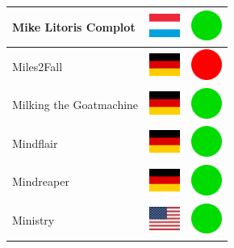 \documentclass[12pt, a4paper, twoside]{report}
\begin{document}
\begin{center}
\begin{longtable}{|p{5cm}|p{2cm}|p{2cm}|}
 Mike Litoris Complot                                       & \includegraphics[width=1cm]{../img/flags/lu} &   \includegraphics[width=1cm]{../likes/y} \\ \hline
 Miles2Fall                                                 & \includegraphics[width=1cm]{../img/flags/de} &   \includegraphics[width=1cm]{../likes/n} \\ \hline
 Milking the Goatmachine                                    & \includegraphics[width=1cm]{../img/flags/de} &   \includegraphics[width=1cm]{../likes/y} \\ \hline
 Mindflair                                                  & \includegraphics[width=1cm]{../img/flags/de} &   \includegraphics[width=1cm]{../likes/y} \\ \hline
 Mindreaper                                                 & \includegraphics[width=1cm]{../img/flags/de} &   \includegraphics[width=1cm]{../likes/y} \\ \hline
 Ministry                                                   & \includegraphics[width=1cm]{../img/flags/us} &   \includegraphics[width=1cm]{../likes/y} \\ \hline

\end{longtable}
\end{center}
\end{document}
